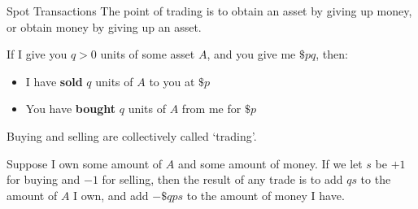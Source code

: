 \documentclass{beamer}
\begin{document}
\begin{frame}{Spot Transactions}
	The point of trading is to obtain an asset by giving up money, or obtain money by giving up an asset.%

	If I give you $q>0$ units of some asset $A$, and you give me $\$pq$, then:%
	\begin{itemize}
		\item I have \textbf{sold} $q$ units of $A$ to you at $\$p$
		\item You have \textbf{bought} $q$ units of $A$ from me for $\$p$
	\end{itemize} %

	Buying and selling are collectively called `trading'.%

	Suppose I own some amount of $A$ and some amount of money. If we let $s$ be $+1$ for buying and $-1$ for selling, then the result of any trade is to add $qs$ to the amount of $A$ I own, and add $-\$qps$ to the amount of money I have. %

\end{frame}
\end{document}
